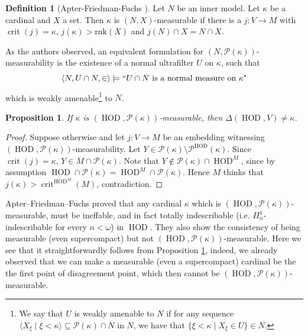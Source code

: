 \documentclass[11pt]{amsart}
\newtheorem{proposition}[theorem]{Proposition}
\theoremstyle{definition}
\newtheorem{definition}[theorem]{Definition}
\theoremstyle{remark}
\DeclareMathOperator{\crit}{crit}
\DeclareMathOperator{\HOD}{HOD}
\begin{document}
\begin{definition}[Apter-Friedman-Fuchs {\cite{APTER2021102901}}]
    Let $N$ be an inner model. Let $\kappa$ be a cardinal and $X$ a set. Then $\kappa$ is $(N, X)$-measurable if
there is a $j \colon V \to M$ with $\crit(j)=\kappa$, $j(\kappa) > \text{rnk}(X)$ and
$j(N) \cap X = N \cap X$.
\end{definition}
As the authors observed, an equivalent formulation for $(N,\mathcal{P}(\kappa))$-measura\-bility is the existence of a normal ultrafilter $U$ on $\kappa$, such that $$\text{$\langle N,U\cap N,\in\rangle\models ``U\cap N$ is a normal measure on $\kappa$"}$$ which is weakly amenable\footnote{We say that $U$ is weakly amenable to $N$ if for any sequence $\langle X_\xi\mid \xi<\kappa\rangle\subseteq \mathcal{P}(\kappa)\cap N$ in $N$, we have that $\{\xi<\kappa\mid X_\xi\in U\}\in N$.} to $N$.
\begin{proposition}\label{Prop: first point is not HOD-measurable}
    If $\kappa$ is $(\HOD,\mathcal{P}(\kappa))$-measurable, then $\Delta(\HOD, V)\neq \kappa$.
\end{proposition}
\begin{proof}
    Suppose otherwise and let $j:V\to M$ be an embedding witnessing $(\HOD,\mathcal{P}(\kappa))$-measurability. Let $Y\in \mathcal{P}(\kappa)\setminus \mathcal{P}^{\HOD}(\kappa)$. Since $\crit(j)=\kappa$, $Y\in M\cap \mathcal{P}(\kappa)$. Note that $Y\notin \mathcal{P}(\kappa)\cap \HOD^M$, since by assumption $\HOD\cap \mathcal{P}(\kappa)=\HOD^M\cap \mathcal{P}(\kappa)$. Hence $M$ thinks that  $j(\kappa)>\crit^{\HOD^M}(M)$, contradiction.  
\end{proof}
Apter--Friedman--Fuchs proved that any cardinal $\kappa$ which is $(\HOD,\mathcal{P}(\kappa))$-measurable, must be ineffable, and in fact totally indescribable (i.e. $\Pi^1_n$-indescribable for every $n<\omega$) in $\HOD$. They also show the consistency of being measurable (even supercompact) but not $(\HOD,\mathcal{P}(\kappa))$-measurable. Here we see that it straightforwardly follows from Proposition \ref{Prop: first point is not HOD-measurable}, indeed, we already observed that we can make a measurable (even a supercompact) cardinal be the the first point of disagreement point, which then cannot be $(\HOD,\mathcal{P}(\kappa))$-measurable.
\end{document}
